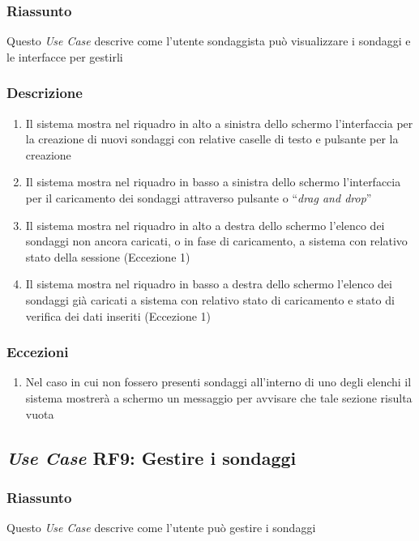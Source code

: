         \subsubsection{Riassunto}
            Questo \textit{Use Case} descrive come l'utente sondaggista può visualizzare i sondaggi e le interfacce per gestirli
        \subsubsection{Descrizione}
            \begin{enumerate}
                \item Il sistema mostra nel riquadro in alto a sinistra dello schermo l'interfaccia per la creazione di nuovi sondaggi con relative caselle di testo e pulsante per la creazione
                \item Il sistema mostra nel riquadro in basso a sinistra dello schermo l'interfaccia per il caricamento dei sondaggi attraverso pulsante o ``\textit{drag and drop}''
                \item Il sistema mostra nel riquadro in alto a destra dello schermo l'elenco dei sondaggi non ancora caricati, o in fase di caricamento, a sistema con relativo stato della sessione (Eccezione 1)
                \item Il sistema mostra nel riquadro in basso a destra dello schermo l'elenco dei sondaggi già caricati a sistema con relativo stato di caricamento e stato di verifica dei dati inseriti (Eccezione 1)
            \end{enumerate}
        \subsubsection{Eccezioni}
            \begin{enumerate}
                \item Nel caso in cui non fossero presenti sondaggi all'interno di uno degli elenchi il sistema mostrerà a schermo un messaggio per avvisare che tale sezione risulta vuota
            \end{enumerate}

    \subsection{\textit{Use Case} RF9: Gestire i sondaggi}
        \subsubsection{Riassunto}
            Questo \textit{Use Case} descrive come l'utente può gestire i sondaggi

